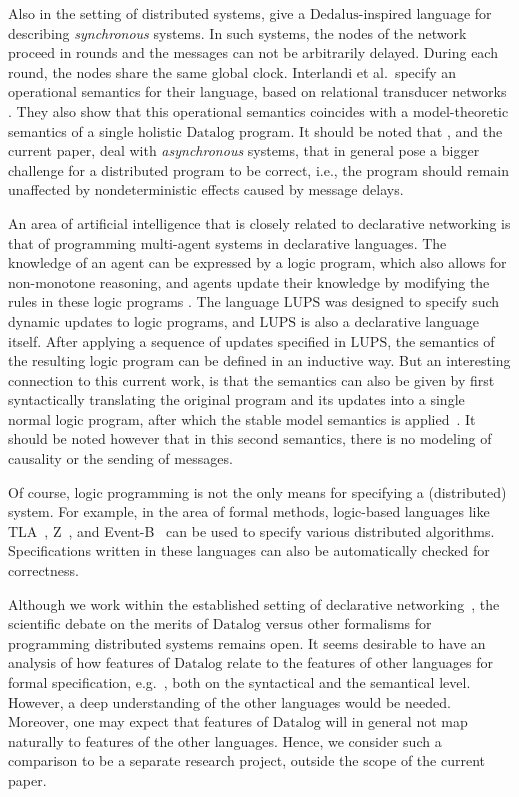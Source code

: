 \documentclass{tlp}
\newcommand{\langname}[1]{\text{#1}}  \newcommand{\pred}[1]{\mathtt{#1}}  \newcommand{\fname}[1]{\mathit{#1}}  \newcommand{\sq}[1]{`{#1}'}
\newcommand{\dedalus}{\langname{Dedalus}}
\newcommand{\datalog}{\langname{Datalog}}
\newcommand{\lups}{\langname{LUPS}}
\begin{document}
Also in the setting of distributed systems, 
give a $\dedalus$-inspired language for describing \emph{synchronous}
systems. In such systems, the nodes of the network proceed in rounds
and the messages can not be arbitrarily delayed. During each round,
the nodes share the same global clock. Interlandi et al.\ specify
an operational semantics for their language, based on relational transducer
networks \cite{ameloot_jacm_2013}. They also show that this operational
semantics coincides with a model-theoretic semantics of a single holistic
$\datalog$ program.  It should be noted that ,
and the current paper, deal with \emph{asynchronous} systems, that
in general pose a bigger challenge for a distributed program to be
correct, i.e., the program should remain unaffected by nondeterministic
effects caused by message delays. 

An area of artificial intelligence that is closely related to declarative
networking is that of programming multi-agent systems in declarative
languages. The knowledge of an agent can be expressed by a logic program,
which also allows for non-monotone reasoning, and agents update their
knowledge by modifying the rules in these logic programs \cite{leite_minerva,nigam_agents,leite_evolp}.
The language $\lups$ \cite{alferes_lups} was designed to specify
such dynamic updates to logic programs, and $\lups$ is also a declarative
language itself. After applying a sequence of updates specified in
$\lups$, the semantics of the resulting logic program can be defined
in an inductive way. But an interesting connection to this current
work, is that the semantics can also be given by first syntactically
translating the original program and its updates into a single normal
logic program, after which the stable model semantics is applied~\cite{alferes_lups}.
It should be noted however that in this second semantics, there is
no modeling of causality or the sending of messages.

Of course, logic programming is not the only means for specifying
a (distributed) system. For example, in the area of formal methods,
logic-based languages like TLA~\cite{lamport_dist_tla}, Z~\cite{using_z},
and Event-B~\cite{event_b} can be used to specify various distributed
algorithms. Specifications written in these languages can also be
automatically checked for correctness.

Although we work within the established setting of declarative networking~\cite{decl_netw_cacm}, the scientific debate on the merits of $\datalog$ versus other formalisms for programming distributed systems remains open. 
It seems desirable to have an analysis of how features of $\datalog$ relate to the features of other languages for formal specification, e.g.~\cite{lamport_dist_tla,using_z,event_b}, both on the syntactical and the semantical level. 
However, a deep understanding of the other languages would be needed. Moreover, one may expect that features of $\datalog$ will in general not map naturally to features of the other languages. Hence, we consider such a comparison to be a separate research project, outside the scope of the current paper.
\end{document}

